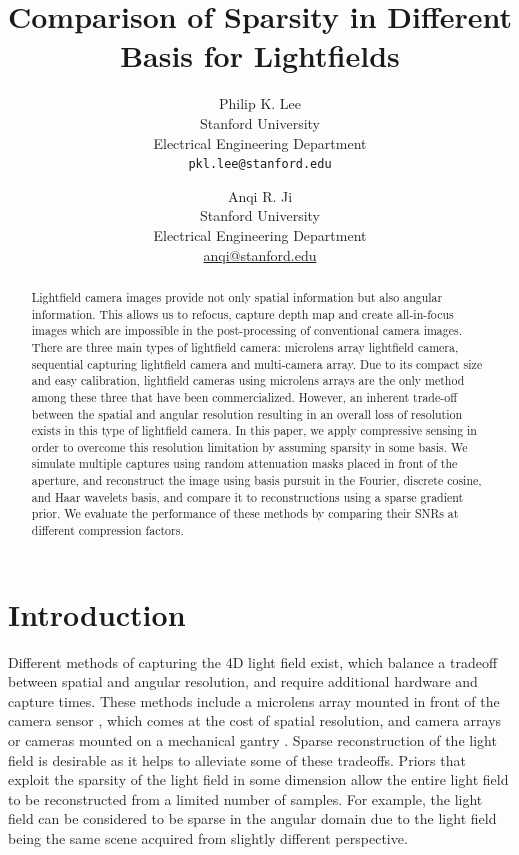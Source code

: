 \documentclass[10pt,twocolumn,letterpaper]{article}
\begin{document}
\title{Comparison of Sparsity in Different Basis for Lightfields}

\author{Philip K. Lee\\
Stanford University\\
Electrical Engineering Department\\
{\tt\small pkl.lee@stanford.edu}
\and
Anqi R. Ji\\
Stanford University\\
Electrical Engineering Department\\
{\small\url{anqi@stanford.edu}}
}

\maketitle
\thispagestyle{empty}

\begin{abstract}
Lightfield camera images provide not only spatial information but also angular information. This allows us to refocus, capture depth map and create all-in-focus images which are impossible in the post-processing of conventional camera images. There are three main types of lightfield camera: microlens array lightfield camera, sequential capturing lightfield camera and multi-camera array. Due to its compact size and easy calibration, lightfield cameras using microlens arrays are the only method among these three that have been commercialized. However, an inherent trade-off between the spatial and angular resolution resulting in an overall loss of resolution exists in this type of lightfield camera. In this paper, we apply compressive sensing in order to overcome this resolution limitation by assuming sparsity in some basis. We simulate multiple captures using random attenuation masks placed in front of the aperture, and reconstruct the image using basis pursuit in the Fourier, discrete cosine, and Haar wavelets basis, and compare it to reconstructions using a sparse gradient prior. We evaluate the performance of these methods by comparing their SNRs at different compression factors. 
\end{abstract}

\section{Introduction}

Different methods of capturing the 4D light field exist, which balance a tradeoff between spatial and angular resolution, and require additional hardware and capture times. These methods include a microlens array mounted in front of the camera sensor \cite{NgLF}, which comes at the cost of spatial resolution, and camera arrays \cite{LFArray} or cameras mounted on a mechanical gantry \cite{LFRendering}. Sparse reconstruction of the light field is desirable as it helps to alleviate some of these tradeoffs. Priors that exploit the sparsity of the light field in some dimension allow the entire light field to be reconstructed from a limited number of samples. For example, the light field can be considered to be sparse in the angular domain due to the light field being the same scene acquired from slightly different perspective. 
\end{document}
